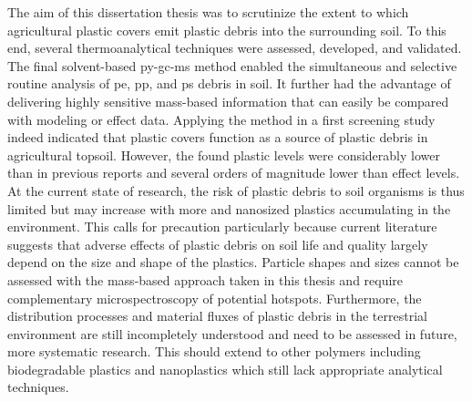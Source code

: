 The aim of this dissertation thesis was to scrutinize the extent to which agricultural plastic covers emit plastic debris into the surrounding soil. To this end, several thermoanalytical techniques were assessed, developed, and validated. The final solvent-based \ac{py-gc-ms} method enabled the simultaneous and selective routine analysis of \ac{pe}, \ac{pp}, and \ac{ps} debris in soil. It further had the advantage of delivering highly sensitive mass-based information that can easily be compared with modeling or effect data. Applying the method in a first screening study indeed indicated that plastic covers function as a source of plastic debris in agricultural topsoil. However, the found plastic levels were considerably lower than in previous reports and several orders of magnitude lower than effect levels. At the current state of research, the risk of plastic debris to soil organisms is thus limited but may increase with more and nanosized plastics accumulating in the environment. This calls for precaution particularly because current literature suggests that adverse effects of plastic debris on soil life and quality largely depend on the size and shape of the plastics. Particle shapes and sizes cannot be assessed with the mass-based approach taken in this thesis and require complementary microspectroscopy of potential hotspots.
Furthermore, the distribution processes and material fluxes of plastic debris in the terrestrial environment are still incompletely understood and need to be assessed in future, more systematic research. This should extend to other polymers including biodegradable plastics and nanoplastics which still lack appropriate analytical techniques.

